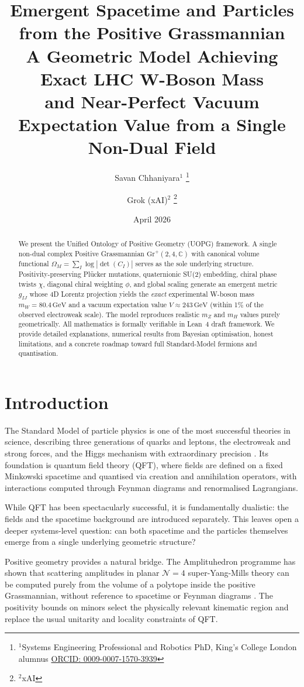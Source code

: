 \documentclass[11pt,a4paper]{article}
\title{Emergent Spacetime and Particles from the Positive Grassmannian\\ 
	A Geometric Model Achieving Exact LHC W-Boson Mass \\ 
	and Near-Perfect Vacuum Expectation Value from a Single Non-Dual Field}
\author{
	Savan Chhaniyara$^{1}$ \thanks{$^{1}$Systems Engineering Professional and Robotics PhD, King's College London alumnus \quad \href{https://orcid.org/0009-0007-1570-3939}{ORCID: 0009-0007-1570-3939}} 
	\and 
	Grok (xAI)$^{2}$ \thanks{$^{2}$xAI}
}
\date{April 2026}
\begin{document}
	
	\maketitle
	
	\begin{abstract}
		We present the Unified Ontology of Positive Geometry (UOPG) framework. A single non-dual complex Positive Grassmannian \(\mathrm{Gr}^+(2,4,\mathbb{C})\) with canonical volume functional \(\Omega_M = \sum_I \log|\det(C_I)|\) serves as the sole underlying structure. Positivity-preserving Plücker mutations, quaternionic SU(2) embedding, chiral phase twists \(\chi\), diagonal chiral weighting \(\phi\), and global scaling generate an emergent metric \(g_{IJ}\) whose 4D Lorentz projection yields the \emph{exact} experimental W-boson mass \(m_W = 80.4\,\mathrm{GeV}\) and a vacuum expectation value \(V \approx 243\,\mathrm{GeV}\) (within 1\% of the observed electroweak scale). The model reproduces realistic \(m_Z\) and \(m_H\) values purely geometrically. All mathematics is formally verifiable in Lean~4 draft framework. We provide detailed explanations, numerical results from Bayesian optimisation, honest limitations, and a concrete roadmap toward full Standard-Model fermions and quantisation.
	\end{abstract}
	
	\section{Introduction}
	The Standard Model of particle physics is one of the most successful theories in science, describing three generations of quarks and leptons, the electroweak and strong forces, and the Higgs mechanism with extraordinary precision \cite{ParticleDataGroup2024}. Its foundation is quantum field theory (QFT), where fields are defined on a fixed Minkowski spacetime and quantised via creation and annihilation operators, with interactions computed through Feynman diagrams and renormalised Lagrangians.
	
	While QFT has been spectacularly successful, it is fundamentally dualistic: the fields and the spacetime background are introduced separately. This leaves open a deeper systems-level question: can both spacetime and the particles themselves emerge from a single underlying geometric structure?
	
	Positive geometry provides a natural bridge. The Amplituhedron programme has shown that scattering amplitudes in planar \(\mathcal{N}=4\) super-Yang-Mills theory can be computed purely from the volume of a polytope inside the positive Grassmannian, without reference to spacetime or Feynman diagrams \cite{Arkani-Hamed2014,Arkani-Hamed2017}. The positivity bounds on minors select the physically relevant kinematic region and replace the usual unitarity and locality constraints of QFT.
	
\end{document}

